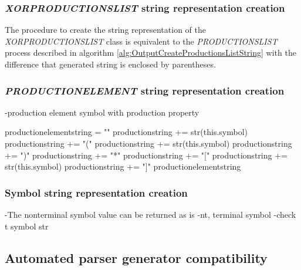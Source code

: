 \subsubsection{\textit{XOR\textunderscore PRODUCTIONS\textunderscore LIST} string representation creation}
The procedure to create the string representation of the \textit{XOR\textunderscore PRODUCTIONS\textunderscore LIST} class is equivalent to the \textit{PRODUCTIONS\textunderscore LIST} process described in algorithm \ref{alg:OutputCreateProductionsListString} with the difference that generated string is enclosed by parentheses.
\subsubsection{\textit{PRODUCTION\textunderscore ELEMENT} string representation creation}

-production element symbol with production property 

\begin{algorithm}[H]
\caption{\textit{PRODUCTION\textunderscore ELEMENT}  string creation}
\label{alg:OutputCreateProductionElementString}
\begin{algorithmic}[1]
\State production\textunderscore element\textunderscore string = ""
		\State production\textunderscore string += str(this.symbol)
		\State production\textunderscore string += "("
		\State production\textunderscore string += str(this.symbol)
		\State production\textunderscore string += ")"
		\State production\textunderscore string += "*"
		\State production\textunderscore string += "["
		\State production\textunderscore string += str(this.symbol)
		\State production\textunderscore string += "]"
	\EndIf
\State production\textunderscore element\textunderscore string
\end{algorithmic}
\end{algorithm}

\subsubsection{Symbol string representation creation}

-The nonterminal symbol value can be returned as is
-nt, terminal symbol
-check t symbol str

\subsection{Automated parser generator compatibility}\label{sec:ImplementationAutomatedParserGenerator}

